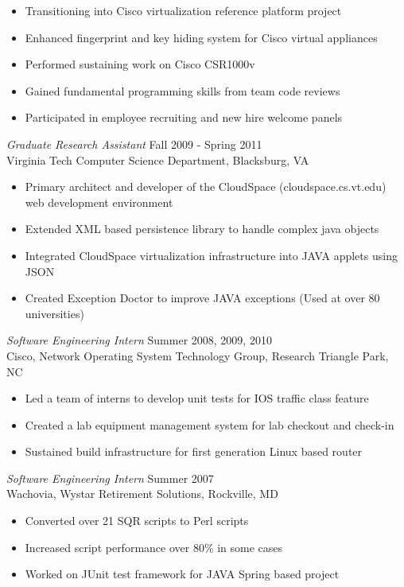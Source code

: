 \documentclass[line,margin]{res}
\begin{document}
\begin{resume}
\begin{itemize}
\begin{itemize}
            \end{itemize}
            \item Transitioning into Cisco virtualization reference platform project
            \item Enhanced fingerprint and key hiding system for Cisco virtual appliances
            \item Performed sustaining work on Cisco CSR1000v
            \item Gained fundamental programming skills from team code reviews
            \item Participated in employee recruiting and new hire welcome panels
        \end{itemize}
        {\sl Graduate Research Assistant} \hfill  Fall 2009 - Spring 2011 \\
        Virginia Tech Computer Science Department, Blacksburg, VA
        \begin{itemize} \itemsep -2pt
            \item Primary architect and developer of the CloudSpace (cloudspace.cs.vt.edu) web development environment
            \item Extended XML based persistence library to handle complex java objects
            \item Integrated CloudSpace virtualization infrastructure into JAVA applets using JSON
            \item Created Exception Doctor to improve JAVA exceptions (Used at over 80 universities)
        \end{itemize}
        {\sl Software Engineering Intern} \hfill  Summer 2008, 2009, 2010 \\
           Cisco, Network Operating System Technology Group, Research Triangle Park, NC
              \begin{itemize}  \itemsep -2pt
                   \item Led a team of interns to develop unit tests for IOS traffic class feature
                   \item Created a lab equipment management system for lab checkout and check-in
                   \item Sustained build infrastructure for first generation Linux based router
              \end{itemize}
        {\sl Software Engineering Intern} \hfill  Summer 2007 \\
           Wachovia, Wystar Retirement Solutions, Rockville, MD
              \begin{itemize}  \itemsep -2pt %
                   \item Converted over 21 SQR scripts to Perl scripts
                   \item Increased script performance over 80\% in some cases
                   \item Worked on JUnit test framework for JAVA Spring based project
              \end{itemize}
 

\end{resume}
\end{document}
